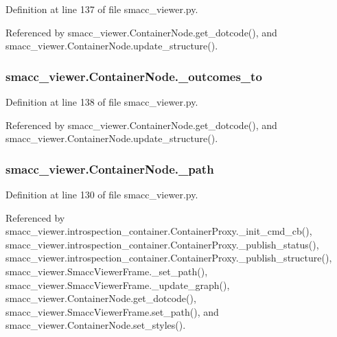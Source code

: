 Definition at line 137 of file smacc\+\_\+viewer.\+py.



Referenced by smacc\+\_\+viewer.\+Container\+Node.\+get\+\_\+dotcode(), and smacc\+\_\+viewer.\+Container\+Node.\+update\+\_\+structure().

\subsubsection[{\texorpdfstring{\+\_\+outcomes\+\_\+to}{_outcomes_to}}]{\setlength{\rightskip}{0pt plus 5cm}smacc\+\_\+viewer.\+Container\+Node.\+\_\+outcomes\+\_\+to\hspace{0.3cm}{\ttfamily [private]}}\hypertarget{classsmacc__viewer_1_1ContainerNode_a26f35e2c039a0a7d5f68a5abfc918627}{}\label{classsmacc__viewer_1_1ContainerNode_a26f35e2c039a0a7d5f68a5abfc918627}


Definition at line 138 of file smacc\+\_\+viewer.\+py.



Referenced by smacc\+\_\+viewer.\+Container\+Node.\+get\+\_\+dotcode(), and smacc\+\_\+viewer.\+Container\+Node.\+update\+\_\+structure().

\subsubsection[{\texorpdfstring{\+\_\+path}{_path}}]{\setlength{\rightskip}{0pt plus 5cm}smacc\+\_\+viewer.\+Container\+Node.\+\_\+path\hspace{0.3cm}{\ttfamily [private]}}\hypertarget{classsmacc__viewer_1_1ContainerNode_ae600e450e4ccfa137937076c391ded72}{}\label{classsmacc__viewer_1_1ContainerNode_ae600e450e4ccfa137937076c391ded72}


Definition at line 130 of file smacc\+\_\+viewer.\+py.



Referenced by smacc\+\_\+viewer.\+introspection\+\_\+container.\+Container\+Proxy.\+\_\+init\+\_\+cmd\+\_\+cb(), smacc\+\_\+viewer.\+introspection\+\_\+container.\+Container\+Proxy.\+\_\+publish\+\_\+status(), smacc\+\_\+viewer.\+introspection\+\_\+container.\+Container\+Proxy.\+\_\+publish\+\_\+structure(), smacc\+\_\+viewer.\+Smacc\+Viewer\+Frame.\+\_\+set\+\_\+path(), smacc\+\_\+viewer.\+Smacc\+Viewer\+Frame.\+\_\+update\+\_\+graph(), smacc\+\_\+viewer.\+Container\+Node.\+get\+\_\+dotcode(), smacc\+\_\+viewer.\+Smacc\+Viewer\+Frame.\+set\+\_\+path(), and smacc\+\_\+viewer.\+Container\+Node.\+set\+\_\+styles().

